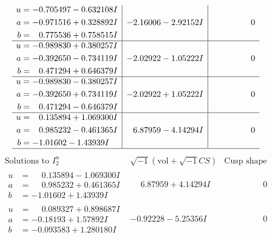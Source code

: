 \documentclass[1p]{elsarticle_modified}
\theoremstyle{definition}
\newcommand{\I}{\sqrt{-1}}
\begin{document}
$$\begin{array}{c|c|c}
\begin{aligned}
u &= -0.705497 - 0.632108 I \\
a &= -0.971516 + 0.328892 I \\
b &= \phantom{-}0.775536 + 0.758515 I\end{aligned}
 & -2.16006 - 2.92152 I & \phantom{-0.000000 } 0 \\ \hline\begin{aligned}
u &= -0.989830 + 0.380257 I \\
a &= -0.392650 - 0.734119 I \\
b &= \phantom{-}0.471294 + 0.646379 I\end{aligned}
 & -2.02922 - 1.05222 I & \phantom{-0.000000 } 0 \\ \hline\begin{aligned}
u &= -0.989830 - 0.380257 I \\
a &= -0.392650 + 0.734119 I \\
b &= \phantom{-}0.471294 - 0.646379 I\end{aligned}
 & -2.02922 + 1.05222 I & \phantom{-0.000000 } 0 \\ \hline\begin{aligned}
u &= \phantom{-}0.135894 + 1.069300 I \\
a &= \phantom{-}0.985232 - 0.461365 I \\
b &= -1.01602 - 1.43939 I\end{aligned}
 & \phantom{-}6.87959 - 4.14294 I & \phantom{-0.000000 } 0\\
 \hline 
 \end{array}$$\newpage$$\begin{array}{c|c|c}  
\text{Solutions to }I^u_{2}& \I (\text{vol} + \sqrt{-1}CS) & \text{Cusp shape}\\
 \hline 
\begin{aligned}
u &= \phantom{-}0.135894 - 1.069300 I \\
a &= \phantom{-}0.985232 + 0.461365 I \\
b &= -1.01602 + 1.43939 I\end{aligned}
 & \phantom{-}6.87959 + 4.14294 I & \phantom{-0.000000 } 0 \\ \hline\begin{aligned}
u &= \phantom{-}0.089327 + 0.898687 I \\
a &= -0.18193 + 1.57892 I \\
b &= -0.093583 + 1.280180 I\end{aligned}
 & -0.92228 - 5.25356 I & \phantom{-0.000000 } 0 \\ \hline\begin{aligned}

\end{aligned}
\end{array}$$
\end{document}
